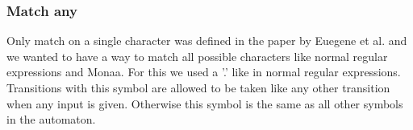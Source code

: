 

\subsubsection{Match any}
Only match on a single character was defined in the paper by Euegene et al. and we wanted to have a way to match all possible characters like normal regular expressions and Monaa. For this we used a '.' like in normal regular expressions. Transitions with this symbol are allowed to be taken like any other transition when any input is given. Otherwise this symbol is the same as all other symbols in the automaton.


